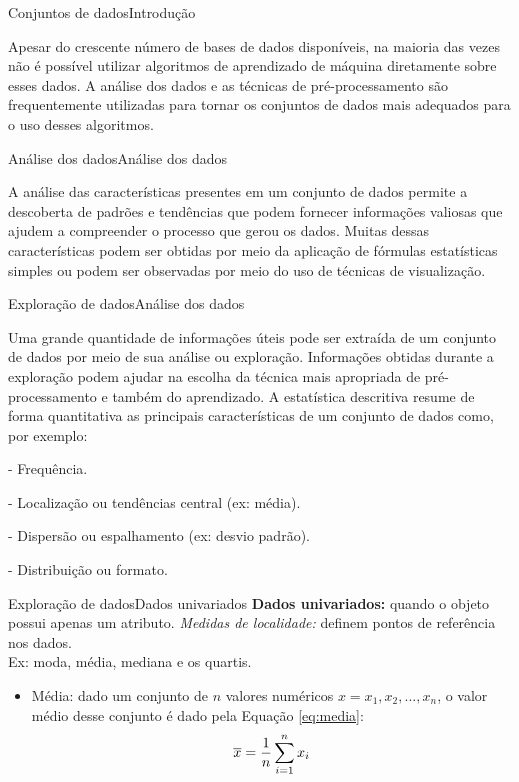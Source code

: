 \documentclass[t]{beamer}
\begin{document}

\begin{ftst}{Conjuntos de dados}{Introdução}

Apesar do crescente número de bases de dados disponíveis, na maioria das vezes não é possível utilizar algoritmos de aprendizado de máquina diretamente sobre esses dados.
\vone
A análise dos dados e as técnicas de pré-processamento são frequentemente utilizadas para tornar os conjuntos de dados mais adequados para o uso desses algoritmos.
\vone


\end{ftst}


\begin{ftst}{Análise dos dados}{Análise dos dados}

A análise das características presentes em um conjunto de dados permite a descoberta de padrões e tendências que podem fornecer informações valiosas que ajudem a compreender o processo que gerou os dados.
\vone
Muitas dessas características podem ser obtidas por meio da aplicação de fórmulas estatísticas simples ou podem ser observadas por meio do uso de técnicas de visualização.

\end{ftst}

\begin{ftst}{Exploração de dados}{Análise dos dados}

Uma grande quantidade de informações úteis pode ser extraída de um conjunto de dados por meio de sua análise ou exploração.
\vone
Informações obtidas durante a exploração podem ajudar na escolha da técnica mais apropriada de pré-processamento e também do aprendizado.
\vone
A estatística descritiva resume de forma quantitativa as principais características de um conjunto de dados como, por exemplo:

- Frequência.

- Localização ou tendências central (ex: média).

- Dispersão ou espalhamento (ex: desvio padrão).

- Distribuição ou formato.


\end{ftst}


\begin{ftst}{Exploração de dados}{Dados univariados}
\textbf{Dados univariados:} quando o objeto possui apenas um atributo.
\vone
\textit{Medidas de localidade:} definem pontos de referência nos dados.\\
Ex: moda, média, mediana e os quartis.
\vone
\begin{itemize}
    \item Média: dado um conjunto de $n$ valores numéricos $x = {x_1, x_2, ..., x_n}$, o valor médio desse conjunto é dado pela Equação \ref{eq:media}:
    \begin{equation}
        \centering
        \overline{x} = \frac{1}{n} \sum_{i=1}^{n}{x_i}
        \label{eq:media}
    \end{equation}
\end{itemize}
\vone

\end{ftst}
\end{document}
